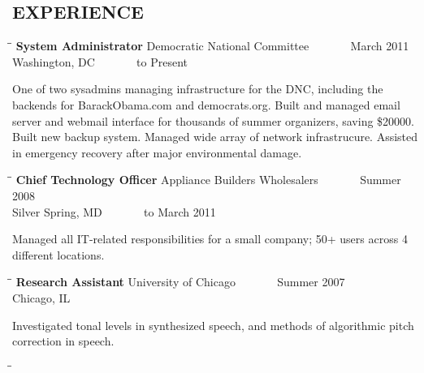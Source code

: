 \documentclass{res}
\begin{document}
\begin{resume}
\section{EXPERIENCE}
   \vspace{-0.1in}	
   \begin{tabbing}
   \hspace{2.3in}\= \hspace{2.6in}\= \kill %
    {\bf System Administrator} \>Democratic National Committee \> ~~~~~~ March 2011 \\
                             \>Washington, DC                    \> ~~~~~~ to Present
   \end{tabbing}\vspace{-20pt}      %
   One of two sysadmins managing infrastructure for the DNC, including the backends for BarackObama.com and democrats.org. Built and managed email server and webmail interface for thousands of summer organizers, saving \$20000. Built new backup system. Managed wide array of network infrastrucure. Assisted in emergency recovery after major environmental damage.
   \begin{tabbing}
   \hspace{2.3in}\= \hspace{2.6in}\= \kill %
    {\bf Chief Technology Officer} \>Appliance Builders Wholesalers \> ~~~~~~ Summer 2008 \\
                             \>Silver Spring, MD                    \> ~~~~~~ to March 2011
   \end{tabbing}\vspace{-20pt}      %
    Managed all IT-related responsibilities for a small company; 50+ users across 4 different locations.
   \begin{tabbing}
   \hspace{2.3in}\= \hspace{2.6in}\= \kill %
    {\bf Research Assistant} \>University of Chicago \> ~~~~~~ Summer 2007\\
                          \>Chicago, IL
   \end{tabbing}\vspace{-20pt}
   Investigated tonal levels in synthesized speech, and methods of algorithmic pitch correction
   in speech.
   \begin{tabbing}
   \hspace{2.3in}\= \hspace{2.6in}\= \kill %

\end{tabbing}
\end{resume}
\end{document}
